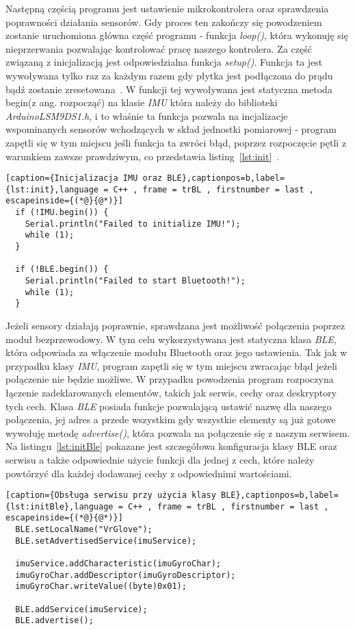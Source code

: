 Następną częścią programu jest ustawienie mikrokontrolera oraz sprawdzenia poprawności działania sensorów. Gdy proces ten zakończy się powodzeniem zostanie uruchomiona główna część programu - funkcja \textit{loop()}, która wykonuję się nieprzerwania pozwalając kontrolować pracę naszego kontrolera. Za część związaną z inicjalizacją jest odpowiedzialna funkcja \textit{setup()}. Funkcja ta jest wywoływana tylko raz za każdym razem gdy płytka jest podłączona do prądu bądź zostanie zresetowana~\cite{ArduinoDoc}. W funkcji tej wywoływana jest statyczna metoda begin(z ang. rozpocząć) na klasie \textit{IMU} która należy do biblioteki \textit{Arduino\textunderscore LSM9DS1.h}, i to właśnie ta funkcja pozwala na incjalizacje wspominanych sensorów wchodzących w skład jednostki pomiarowej - program zapętli się w tym miejscu jeśli funkcja ta zwróci błąd, poprzez rozpoczęcie pętli z warunkiem zawsze prawdziwym, co przedstawia listing~\ref{lst:init}~\cite{ArduinoIMU}. 
\begin{lstlisting}[caption={Inicjalizacja IMU oraz BLE},captionpos=b,label={lst:init},language = C++ , frame = trBL , firstnumber = last , escapeinside={(*@}{@*)}]
  if (!IMU.begin()) {
    Serial.println("Failed to initialize IMU!");
    while (1);
  }

  if (!BLE.begin()) {
    Serial.println("Failed to start Bluetooth!");
    while (1);
  }
\end{lstlisting}
Jeżeli sensory działają poprawnie, sprawdzana jest możliwość połączenia poprzez moduł bezprzewodowy. W tym celu wykorzystywana jest statyczna klasa \textit{BLE}, która odpowiada za włączenie modułu Bluetooth oraz jego ustawienia. Tak jak w przypadku klasy \textit{IMU}, program zapętli się w tym miejscu zwracając błąd jeżeli połączenie nie będzie możliwe. W przypadku powodzenia program rozpoczyna łączenie zadeklarowanych elementów, takich jak serwis, cechy oraz deskryptory tych cech. Klasa \textit{BLE} posiada funkcje pozwalającą ustawić nazwę dla naszego połączenia, jej adres a przede wszystkim gdy wszystkie elementy są już gotowe wywołuję metodę \textit{advertise()}, która pozwala na połączenie się z naszym serwisem. Na listingu~\ref{lst:initBle} pokazane jest szczegółowa konfiguracja klasy BLE oraz serwisu a także odpowiednie użycie funkcji dla jednej z cech, które należy powtórzyć dla każdej dodawanej cechy z odpowiednimi wartościami.
\begin{lstlisting}[caption={Obsługa serwisu przy użycia klasy BLE},captionpos=b,label={lst:initBle},language = C++ , frame = trBL , firstnumber = last , escapeinside={(*@}{@*)}]
  BLE.setLocalName("VrGlove");  
  BLE.setAdvertisedService(imuService);

  imuService.addCharacteristic(imuGyroChar);
  imuGyroChar.addDescriptor(imuGyroDescriptor);
  imuGyroChar.writeValue((byte)0x01);
  
  BLE.addService(imuService);     
  BLE.advertise();
\end{lstlisting}
